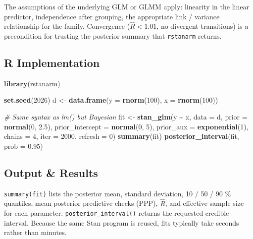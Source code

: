 \documentclass[
]{article}
\newenvironment{Shaded}{\begin{snugshade}}{\end{snugshade}}
\newcommand{\AttributeTok}[1]{\textcolor[rgb]{0.13,0.29,0.53}{#1}}
\newcommand{\CommentTok}[1]{\textcolor[rgb]{0.56,0.35,0.01}{\textit{#1}}}
\newcommand{\DecValTok}[1]{\textcolor[rgb]{0.00,0.00,0.81}{#1}}
\newcommand{\FloatTok}[1]{\textcolor[rgb]{0.00,0.00,0.81}{#1}}
\newcommand{\FunctionTok}[1]{\textcolor[rgb]{0.13,0.29,0.53}{\textbf{#1}}}
\newcommand{\NormalTok}[1]{#1}
\newcommand{\OtherTok}[1]{\textcolor[rgb]{0.56,0.35,0.01}{#1}}
\newcommand{\SpecialCharTok}[1]{\textcolor[rgb]{0.81,0.36,0.00}{\textbf{#1}}}
\begin{document}
The assumptions of the underlying GLM or GLMM apply: linearity in the
linear predictor, independence after grouping, the appropriate link /
variance relationship for the family. Convergence (\(\hat R < 1.01\), no
divergent transitions) is a precondition for trusting the posterior
summary that \texttt{rstanarm} returns.

\subsection{R Implementation}\label{r-implementation}

\begin{Shaded}
\begin{Highlighting}[]
\FunctionTok{library}\NormalTok{(rstanarm)}

\FunctionTok{set.seed}\NormalTok{(}\DecValTok{2026}\NormalTok{)}
\NormalTok{d }\OtherTok{\textless{}{-}} \FunctionTok{data.frame}\NormalTok{(}\AttributeTok{y =} \FunctionTok{rnorm}\NormalTok{(}\DecValTok{100}\NormalTok{), }\AttributeTok{x =} \FunctionTok{rnorm}\NormalTok{(}\DecValTok{100}\NormalTok{))}

\CommentTok{\# Same syntax as lm() but Bayesian}
\NormalTok{fit }\OtherTok{\textless{}{-}} \FunctionTok{stan\_glm}\NormalTok{(y }\SpecialCharTok{\textasciitilde{}}\NormalTok{ x, }\AttributeTok{data =}\NormalTok{ d,}
                \AttributeTok{prior =} \FunctionTok{normal}\NormalTok{(}\DecValTok{0}\NormalTok{, }\FloatTok{2.5}\NormalTok{),}
                \AttributeTok{prior\_intercept =} \FunctionTok{normal}\NormalTok{(}\DecValTok{0}\NormalTok{, }\DecValTok{5}\NormalTok{),}
                \AttributeTok{prior\_aux =} \FunctionTok{exponential}\NormalTok{(}\DecValTok{1}\NormalTok{),}
                \AttributeTok{chains =} \DecValTok{4}\NormalTok{, }\AttributeTok{iter =} \DecValTok{2000}\NormalTok{, }\AttributeTok{refresh =} \DecValTok{0}\NormalTok{)}
\FunctionTok{summary}\NormalTok{(fit)}
\FunctionTok{posterior\_interval}\NormalTok{(fit, }\AttributeTok{prob =} \FloatTok{0.95}\NormalTok{)}
\end{Highlighting}
\end{Shaded}

\subsection{Output \& Results}\label{output-results}

\texttt{summary(fit)} lists the posterior mean, standard deviation, 10 /
50 / 90 \% quantiles, mean posterior predictive checks (PPP),
\(\hat R\), and effective sample size for each parameter.
\texttt{posterior\_interval()} returns the requested credible interval.
Because the same Stan program is reused, fits typically take seconds
rather than minutes.
\end{document}
